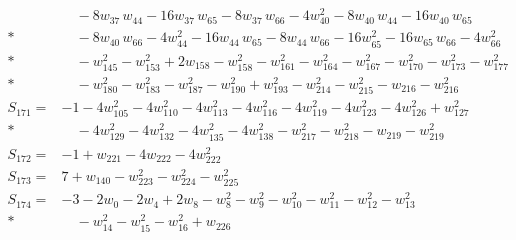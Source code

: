 \begin{align*}
&\quad  - 8w_{37}\,w_{44} - 16w_{37}\,w_{65} - 8w_{37}\,w_{66} - 4w_{40}^{2} - 8w_{40}\,w_{44} - 16w_{40}\,w_{65} \\*
&\quad  - 8w_{40}\,w_{66} - 4w_{44}^{2} - 16w_{44}\,w_{65} - 8w_{44}\,w_{66} - 16w_{65}^{2} - 16w_{65}\,w_{66} - 4w_{66}^{2} \\*
&\quad  - w_{145}^{2} - w_{153}^{2} + 2w_{158} - w_{158}^{2} - w_{161}^{2} - w_{164}^{2} - w_{167}^{2} - w_{170}^{2} - w_{173}^{2} - w_{177}^{2} \\*
&\quad  - w_{180}^{2} - w_{183}^{2} - w_{187}^{2} - w_{190}^{2} + w_{193}^{2} - w_{214}^{2} - w_{215}^{2} - w_{216} - w_{216}^{2} \\[2pt]
S_{171}={}& -1 - 4w_{105}^{2} - 4w_{110}^{2} - 4w_{113}^{2} - 4w_{116}^{2} - 4w_{119}^{2} - 4w_{123}^{2} - 4w_{126}^{2} + w_{127}^{2} \\*
&\quad  - 4w_{129}^{2} - 4w_{132}^{2} - 4w_{135}^{2} - 4w_{138}^{2} - w_{217}^{2} - w_{218}^{2} - w_{219} - w_{219}^{2} \\[2pt]
S_{172}={}& -1 + w_{221} - 4w_{222} - 4w_{222}^{2} \\[2pt]
S_{173}={}& 7 + w_{140} - w_{223}^{2} - w_{224}^{2} - w_{225}^{2} \\[2pt]
S_{174}={}& -3 - 2w_{0} - 2w_{4} + 2w_{8} - w_{8}^{2} - w_{9}^{2} - w_{10}^{2} - w_{11}^{2} - w_{12}^{2} - w_{13}^{2} \\*
&\quad  - w_{14}^{2} - w_{15}^{2} - w_{16}^{2} + w_{226} \\
\end{align*}
\endgroup
